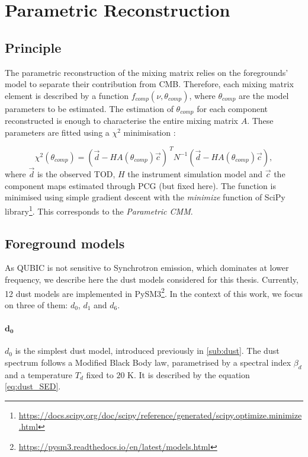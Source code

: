 \documentclass[../../thesis.tex]{subfiles}
\begin{document}
\section{Parametric Reconstruction}

\subsection{Principle}

The parametric reconstruction of the mixing matrix relies on the foregrounds' model to separate their contribution from CMB. Therefore, each mixing matrix element is described by a function $f_{comp} \left(\nu, \theta_{comp}\right)$, where $\theta_{comp}$ are the model parameters to be estimated. The estimation of $\theta_{comp}$ for each component reconstructed is enough to characterise the entire mixing matrix $A$. These parameters are fitted using a $\chi^2$ minimisation :

\begin{equation}
    \chi^2(\theta_{comp}) = \left(\vec{d}-HA\left(\theta_{comp}\right)\vec{c}\right)^{~T} N^{-1} \left(\vec{d}-HA\left(\theta_{comp}\right)\vec{c}\right),
\end{equation}
where $\vec{d}$ is the observed TOD, $H$ the instrument simulation model and $\vec{c}$ the component maps estimated through PCG (but fixed here). The function is minimised using simple gradient descent with the \emph{minimize} function of SciPy library\footnote{\url{https://docs.scipy.org/doc/scipy/reference/generated/scipy.optimize.minimize.html}}. This corresponds to the \emph{Parametric CMM}.

\subsection{Foreground models}

As QUBIC is not sensitive to Synchrotron emission, which dominates at lower frequency, we describe here the dust models considered for this thesis. Currently, 12 dust models are implemented in PySM3\footnote{\url{https://pysm3.readthedocs.io/en/latest/models.html}}. In the context of this work, we focus on three of them: $d_0$, $d_1$ and $d_6$.

\paragraph{$\boldsymbol{d_0}$} \label{paragraph:d0}
$d_0$ is the simplest dust model, introduced previously in \ref{sub:dust}. The dust spectrum follows a Modified Black Body law, parametrised by a spectral index $\beta_d$ and a temperature $T_d$ fixed to $20$ K. It is described by the equation \ref{eq:dust_SED}.
\end{document}
